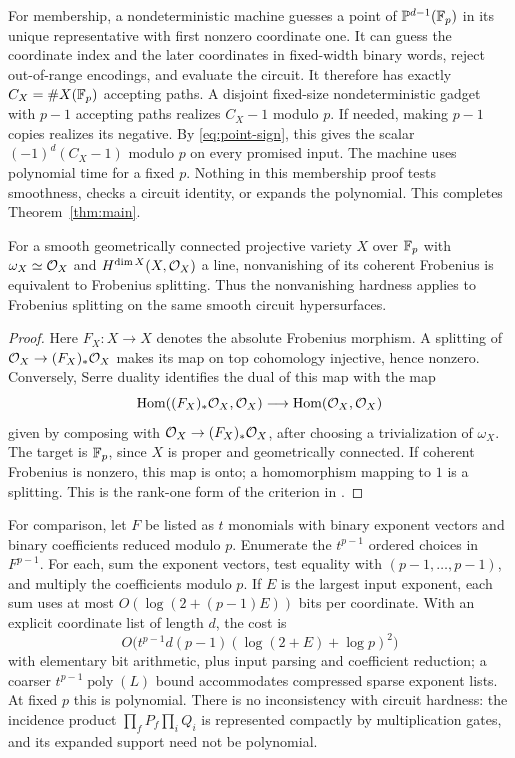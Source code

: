 For membership, a nondeterministic machine guesses a point of $\mathbb P^{d-1}(\mathbb F_p)$ in its unique representative with first nonzero coordinate one. It can guess the coordinate index and the later coordinates in fixed-width binary words, reject out-of-range encodings, and evaluate the circuit. It therefore has exactly $C_X=\#X(\mathbb F_p)$ accepting paths. A disjoint fixed-size nondeterministic gadget with $p-1$ accepting paths realizes $C_X-1$ modulo $p$. If needed, making $p-1$ copies realizes its negative. By \eqref{eq:point-sign}, this gives the scalar $(-1)^d(C_X-1)$ modulo $p$ on every promised input. The machine uses polynomial time for a fixed $p$. Nothing in this membership proof tests smoothness, checks a circuit identity, or expands the polynomial. This completes Theorem~\ref{thm:main}.

\begin{proposition}\label{prop:splitting}
For a smooth geometrically connected projective variety $X$ over $\mathbb F_p$ with $\omega_X\simeq\mathcal O_X$ and $H^{\dim X}(X,\mathcal O_X)$ a line, nonvanishing of its coherent Frobenius is equivalent to Frobenius splitting. Thus the nonvanishing hardness applies to Frobenius splitting on the same smooth circuit hypersurfaces.
\end{proposition}
\begin{proof}
Here $F_X:X\to X$ denotes the absolute Frobenius morphism. A splitting of $\mathcal O_X\to (F_X)_*\mathcal O_X$ makes its map on top cohomology injective, hence nonzero. Conversely, Serre duality identifies the dual of this map with the map
\[
\operatorname{Hom}((F_X)_*\mathcal O_X,\mathcal O_X)\longrightarrow
\operatorname{Hom}(\mathcal O_X,\mathcal O_X)
\]
given by composing with $\mathcal O_X\to (F_X)_*\mathcal O_X$, after choosing a trivialization of $\omega_X$. The target is $\mathbb F_p$, since $X$ is proper and geometrically connected. If coherent Frobenius is nonzero, this map is onto; a homomorphism mapping to $1$ is a splitting. This is the rank-one form of the criterion in \citet[Corollary 2.5 and Remark 2.6]{core-hlyy}.
\end{proof}

For comparison, let $F$ be listed as $t$ monomials with binary exponent vectors and binary coefficients reduced modulo $p$. Enumerate the $t^{p-1}$ ordered choices in $F^{p-1}$. For each, sum the exponent vectors, test equality with $(p-1,\ldots,p-1)$, and multiply the coefficients modulo $p$. If $E$ is the largest input exponent, each sum uses at most $O(\log(2+(p-1)E))$ bits per coordinate. With an explicit coordinate list of length $d$, the cost is
\[
O\bigl(t^{p-1}d(p-1)(\log(2+E)+\log p)^2\bigr)
\]
with elementary bit arithmetic, plus input parsing and coefficient reduction; a coarser $t^{p-1}\operatorname{poly}(L)$ bound accommodates compressed sparse exponent lists. At fixed $p$ this is polynomial. There is no inconsistency with circuit hardness: the incidence product $\prod_fP_f\prod_iQ_i$ is represented compactly by multiplication gates, and its expanded support need not be polynomial.

